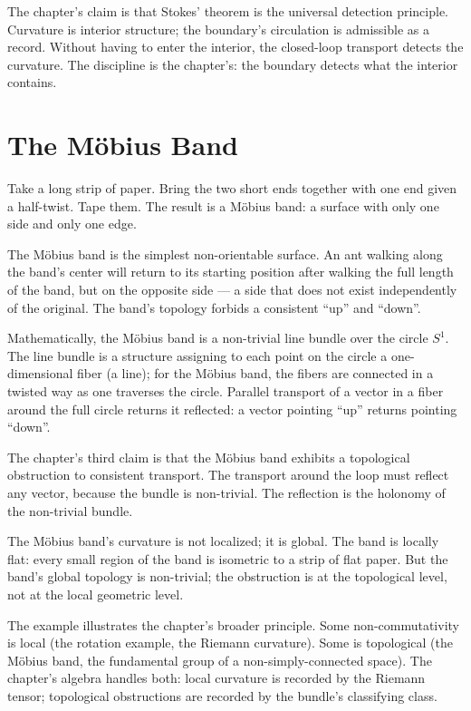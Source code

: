 The chapter's claim is that Stokes' theorem is the universal
detection principle. Curvature is interior structure; the
boundary's circulation is admissible as a record. Without
having to enter the interior, the closed-loop transport detects
the curvature. The discipline is the chapter's: the boundary
detects what the interior contains.

\section{The M\"obius Band}
\label{se:the-mobius-band}

Take a long strip of paper. Bring the two short ends together with
one end given a half-twist. Tape them. The result is a M\"obius
band: a surface with only one side and only one edge.

The M\"obius band is the simplest non-orientable surface. An ant
walking along the band's center will return to its starting
position after walking the full length of the band, but on the
opposite side --- a side that does not exist independently of the
original. The band's topology forbids a consistent ``up'' and
``down''.

Mathematically, the M\"obius band is a non-trivial line bundle
over the circle $S^1$. The line bundle is a structure assigning to
each point on the circle a one-dimensional fiber (a line); for the
M\"obius band, the fibers are connected in a twisted way as one
traverses the circle. Parallel transport of a vector in a fiber
around the full circle returns it reflected: a vector pointing
``up'' returns pointing ``down''.

The chapter's third claim is that the M\"obius band exhibits a
topological obstruction to consistent transport. The transport
around the loop must reflect any vector, because the bundle is
non-trivial. The reflection is the holonomy of the non-trivial
bundle.

The M\"obius band's curvature is not localized; it is global. The
band is locally flat: every small region of the band is
isometric to a strip of flat paper. But the band's global
topology is non-trivial; the obstruction is at the topological
level, not at the local geometric level.

The example illustrates the chapter's broader principle. Some
non-commutativity is local (the rotation example, the
Riemann curvature). Some is topological (the M\"obius band, the
fundamental group of a non-simply-connected space). The
chapter's algebra handles both: local curvature is recorded by
the Riemann tensor; topological obstructions are recorded by
the bundle's classifying class.

